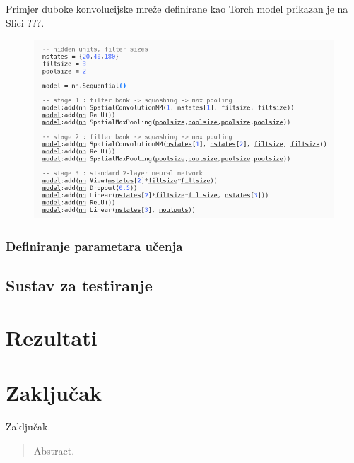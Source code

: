 \documentclass[lmodern, utf8, diplomski, numeric]{fer}
\begin{document}
Primjer duboke konvolucijske mreže definirane kao Torch model prikazan je na Slici ???.

\begin{figure}[ht!]
\centering
\includegraphics[width=16cm]{slike/cnn_model.png}
\caption{}
\end{figure}

\subsection{Definiranje parametara učenja}




\section{Sustav za testiranje}



\chapter{Rezultati}

\chapter{Zaključak}
Zaključak.




\begin{sazetak}


\end{sazetak}

\begin{abstract}
Abstract.

\end{abstract}
\end{document}
